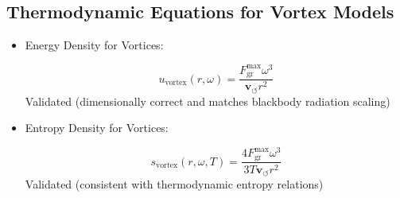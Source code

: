 \documentclass[a4paper,10pt]{article}
\begin{document}
\subsection*{Thermodynamic Equations for Vortex Models}
\begin{itemize}
\item Energy Density for Vortices:

\[
u_\text{vortex}(r, \omega) = \frac{F^{\text{max}}_{\text{gr}} \omega^3}{\mathbf{v}_{\scriptscriptstyle\boldsymbol{\circlearrowleft}} r^2}
\]
 Validated (dimensionally correct and matches blackbody radiation scaling)

\item Entropy Density for Vortices:

\[
s_\text{vortex}(r, \omega, T) = \frac{4 F^{\text{max}}_{\text{gr}} \omega^3}{3 T \mathbf{v}_{\scriptscriptstyle\boldsymbol{\circlearrowleft}} r^2}
\]
 Validated (consistent with thermodynamic entropy relations)

\end{itemize}
\end{document}
